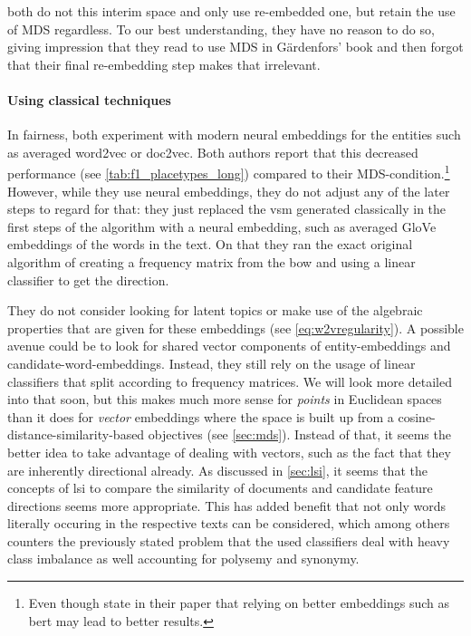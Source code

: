\textcite{Ager2018,Alshaikh2020} both do not this interim space and only use re-embedded one, but retain the use of MDS regardless. To our best understanding, they have no reason to do so, giving impression that they read to use MDS in Gärdenfors' book and then forgot that their final re-embedding step makes that irrelevant. 

\paragraph{Using classical techniques}

In fairness, \cite{Ager2018,Alshaikh2020} both experiment with modern neural embeddings for the entities such as averaged \gls{word2vec} or \gls{doc2vec}. Both authors report that this decreased performance (see \autoref{tab:f1_placetypes_long}) compared to their MDS-condition.\footnote{Even though \textcite{Alshaikh2020} state in their paper that relying on better embeddings such as \gls{bert} \cite{Devlin2019} may lead to better results.} However, while they use neural embeddings, they do not adjust any of the later steps to regard for that: they just replaced the \gls{vsm} generated classically in the first steps of the algorithm with a neural embedding, such as averaged GloVe embeddings \cite{pennington2014glove} of the words in the text. On that they ran the exact original algorithm of creating a frequency matrix from the \gls{bow} and using a linear classifier to get the direction. 


They do not consider looking for latent topics or make use of the algebraic properties that are given for these embeddings (see \autoref{eq:w2vregularity}). A possible avenue could be to look for shared vector components of entity-embeddings and candidate-word-embeddings. Instead, they still rely on the usage of linear classifiers that split according to frequency matrices. We will look more detailed into that soon, but this makes much more sense for \textit{points} in Euclidean spaces than it does for \textit{vector} embeddings where the space is built up from a cosine-distance-similarity-based objectives (see \autoref{sec:mds}). Instead of that, it seems the better idea to take advantage of dealing with vectors, such as the fact that they are inherently directional already. As discussed in \autoref{sec:lsi}, it seems that the concepts of \gls{lsi} to compare the similarity of documents and candidate feature directions seems more appropriate. This has added benefit that not only words literally occuring in the respective texts can be considered, which among others counters the previously stated problem that the used classifiers deal with heavy class imbalance as well accounting for polysemy and synonymy.

